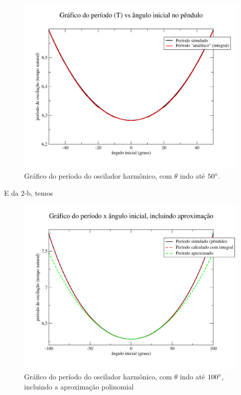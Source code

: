 \documentclass[12pt,a4paper]{article}
\begin{document}
\begin{figure}[H]
\centering
\includegraphics[width=\textwidth]{../tarefa-2a/grafico.png}
\caption{Gráfico do período do oscilador harmônico, com $\theta$ indo até $50\degree$.}
\end{figure}

E da 2-b, temos

\begin{figure}[H]
\centering
\includegraphics[width=\textwidth]{../tarefa-2a/graficocomaprox.png}
\caption{Gráfico do período do oscilador harmônico, com $\theta$ indo até $100\degree$, incluindo a aproximação polinomial}
\end{figure}
\end{document}
